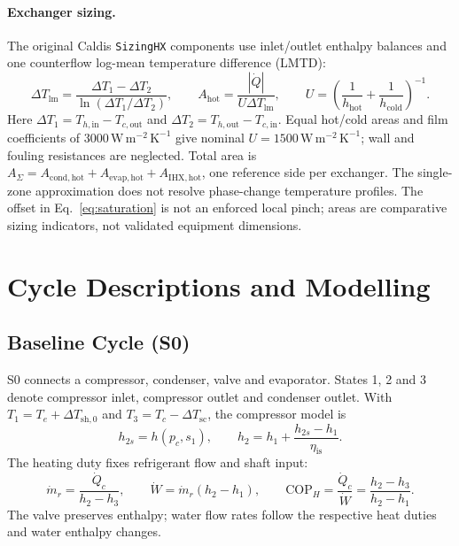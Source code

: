 \documentclass[11pt,a4paper]{article}
\begin{document}
\paragraph{Exchanger sizing.}
The original Caldis \texttt{SizingHX} components use inlet/outlet enthalpy
balances and one counterflow log-mean temperature difference (LMTD):
\begin{equation}
 \Delta T_{\mathrm{lm}}=\frac{\Delta T_1-\Delta T_2}{\ln(\Delta T_1/\Delta T_2)},
 \qquad A_{\mathrm{hot}}=\frac{|\dot Q|}{U\Delta T_{\mathrm{lm}}},\qquad
 U=\left(\frac{1}{h_{\mathrm{hot}}}+\frac{1}{h_{\mathrm{cold}}}\right)^{-1}.
 \label{eq:sizing}
\end{equation}
Here $\Delta T_1=T_{h,\mathrm{in}}-T_{c,\mathrm{out}}$ and
$\Delta T_2=T_{h,\mathrm{out}}-T_{c,\mathrm{in}}$. Equal hot/cold areas and
film coefficients of $3000\,\mathrm{W\,m^{-2}\,K^{-1}}$ give nominal
$U=1500\,\mathrm{W\,m^{-2}\,K^{-1}}$; wall and fouling resistances are
neglected. Total area is
$A_\Sigma=A_{\mathrm{cond,hot}}+A_{\mathrm{evap,hot}}+A_{\mathrm{IHX,hot}}$,
one reference side per exchanger. The single-zone approximation does not
resolve phase-change temperature profiles. The offset in
Eq.~\eqref{eq:saturation} is not an enforced local pinch; areas are
comparative sizing indicators, not validated equipment dimensions.

\clearpage
\section{Cycle Descriptions and Modelling}
\label{sec:model}
\subsection{Baseline Cycle (S0)}
S0 connects a compressor, condenser, valve and evaporator. States 1, 2 and
3 denote compressor inlet, compressor outlet and condenser outlet.
With $T_1=T_e+\Delta T_{\mathrm{sh},0}$ and
$T_3=T_c-\Delta T_{\mathrm{sc}}$, the compressor model is
\begin{equation}
 h_{2s}=h(p_c,s_1),\qquad h_2=h_1+\frac{h_{2s}-h_1}{\eta_{\mathrm{is}}}.
 \label{eq:compressor}
\end{equation}
The heating duty fixes refrigerant flow and shaft input:
\begin{equation}
 \dot m_r=\frac{\dot Q_c}{h_2-h_3},\qquad
 \dot W=\dot m_r(h_2-h_1),\qquad
 \mathrm{COP}_H=\frac{\dot Q_c}{\dot W}=\frac{h_2-h_3}{h_2-h_1}.
 \label{eq:cop}
\end{equation}
The valve preserves enthalpy; water flow rates follow the respective heat
duties and water enthalpy changes.
\end{document}
